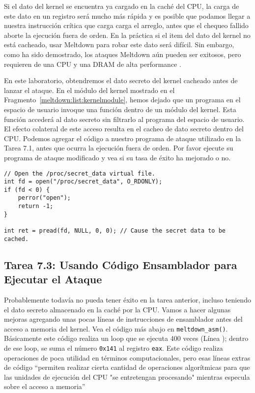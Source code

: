 Si el dato del kernel se encuentra ya cargado en la caché del CPU, la carga de este dato en un registro será mucho más rápida y es posible que podamos llegar a nuestra instrucción crítica que carga carga el arreglo, antes que el chequeo fallido aborte la ejecución fuera de orden. En la práctica si el item del dato del kernel no está cacheado, usar Meltdown para robar este dato será difícil. Sin embargo, como ha sido demostrado, los ataques Meltdown aún pueden ser exitosos, pero requieren de una CPU y una DRAM de alta performance \cite{meltdowdemo}.

En este laboratorio, obtendremos el dato secreto del kernel cacheado antes de lanzar el ataque.
En el módulo del kernel mostrado en el Fragmento~\ref{meltdown:list:kernelmodule}, hemos dejado que un programa en el espacio de usuario invoque una función dentro de un módulo del kernel. Esta función accederá al dato secreto sin filtrarlo al programa del espacio de usuario. El efecto colateral de este acceso resulta en el cacheo de dato secreto dentro del CPU. Podemos agregar el código a nuestro programa de ataque utilizado en la Tarea 7.1, antes que ocurra la ejecución fuera de orden.
Por favor ejecute su programa de ataque modificado y vea si su tasa de éxito ha mejorado o no.

\begin{lstlisting}
// Open the /proc/secret_data virtual file.
int fd = open("/proc/secret_data", O_RDONLY);
if (fd < 0) {
    perror("open");
    return -1;
}

int ret = pread(fd, NULL, 0, 0); // Cause the secret data to be cached.
\end{lstlisting}



\subsection{Tarea 7.3: Usando Código Ensamblador para Ejecutar el Ataque}

Probablemente todavía no pueda tener éxito en la tarea anterior, incluso teniendo el dato secreto almacenado en la caché por la CPU.
Vamos a hacer algunas mejoras agregando unas pocas líneas de instrucciones de ensamblador antes del acceso a memoria del kernel. Vea el código más abajo en \texttt{meltdown\_asm()}. Básicamente este código realiza un loop que se ejecuta 400 veces (Línea ); dentro de ese loop, se suma el número \texttt{0x141} al registro \texttt{eax}. Este código realiza operaciones de poca utilidad en términos computacionales, pero esas líneas extras de código ``permiten realizar cierta cantidad de operaciones algorítmicas para que las unidades de ejecución del CPU "se entretengan procesando" mientras especula sobre el acceso a memoria''~\cite{boldin}


